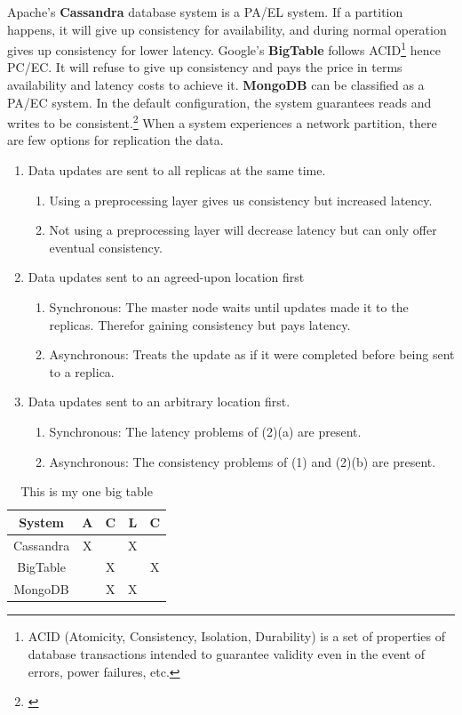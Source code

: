 \noindent Apache's \textbf{Cassandra} database system is a PA/EL system. If a partition happens, it will give up consistency for availability, and during normal operation gives up consistency for lower latency. Google's \textbf{BigTable} follows ACID\footnote{ACID (Atomicity, Consistency, Isolation, Durability) is a set of properties of database transactions intended to guarantee validity even in the event of errors, power failures, etc.} hence PC/EC. It will refuse to give up consistency and pays the price in terms availability and latency costs to achieve it. \textbf{MongoDB} can be classified as a PA/EC system. In the default configuration, the system guarantees reads and writes to be consistent.\footnote{\cite[p.~42]{Abadi2012}} When a system experiences a network partition, there are few options for replication the data.
\begin{enumerate}
	
	\item Data updates are sent to all replicas at the same time.
	\begin{enumerate}
		\item Using a preprocessing layer gives us consistency but increased latency.
		\item Not using a preprocessing layer will decrease latency but can only offer eventual consistency.
	\end{enumerate}
	\item Data updates sent to an agreed-upon location first
	\begin{enumerate}
		\item Synchronous: The master node waits until updates made it to the replicas. Therefor gaining consistency but pays latency.
		\item Asynchronous: Treats the update as if it were completed before being sent to a replica.
	\end{enumerate}
	\item Data updates sent to an arbitrary location first.
		\begin{enumerate}
		\item Synchronous: The latency problems of (2)(a) are present.
		\item Asynchronous: The consistency problems of (1) and (2)(b) are present.
	\end{enumerate}
\end{enumerate}

\begin{table}[H]
	\centering
\begin{tabular}{|c|c|c|c|c|}
	\hline 
	System & A & C & L & C \\ 
	\hline 
	Cassandra & X &  & X &  \\ 
	\hline 
	BigTable &  & X &  & X \\ 
	\hline 
	MongoDB &  & X & X &  \\ 
	\hline 
\end{tabular}
  \caption{This is my one big table} \label{tab:PACELC}
\end{table}
